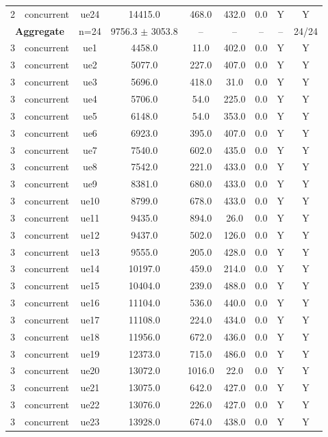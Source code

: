 \begin{table}[ht]
\begin{tabular}{|c|c|c|c|c|c|c|c|c|}
2 & concurrent & ue24 & 14415.0 & 468.0 & 432.0 & 0.0 & Y & Y \\
\multicolumn{2}{|c|}{\textbf{Aggregate}} & n=24 & 9756.3 $\pm$ 3053.8 & -- & -- & -- & -- & 24/24 \\
\hline
3 & concurrent & ue1 & 4458.0 & 11.0 & 402.0 & 0.0 & Y & Y \\
3 & concurrent & ue2 & 5077.0 & 227.0 & 407.0 & 0.0 & Y & Y \\
3 & concurrent & ue3 & 5696.0 & 418.0 & 31.0 & 0.0 & Y & Y \\
3 & concurrent & ue4 & 5706.0 & 54.0 & 225.0 & 0.0 & Y & Y \\
3 & concurrent & ue5 & 6148.0 & 54.0 & 353.0 & 0.0 & Y & Y \\
3 & concurrent & ue6 & 6923.0 & 395.0 & 407.0 & 0.0 & Y & Y \\
3 & concurrent & ue7 & 7540.0 & 602.0 & 435.0 & 0.0 & Y & Y \\
3 & concurrent & ue8 & 7542.0 & 221.0 & 433.0 & 0.0 & Y & Y \\
3 & concurrent & ue9 & 8381.0 & 680.0 & 433.0 & 0.0 & Y & Y \\
3 & concurrent & ue10 & 8799.0 & 678.0 & 433.0 & 0.0 & Y & Y \\
3 & concurrent & ue11 & 9435.0 & 894.0 & 26.0 & 0.0 & Y & Y \\
3 & concurrent & ue12 & 9437.0 & 502.0 & 126.0 & 0.0 & Y & Y \\
3 & concurrent & ue13 & 9555.0 & 205.0 & 428.0 & 0.0 & Y & Y \\
3 & concurrent & ue14 & 10197.0 & 459.0 & 214.0 & 0.0 & Y & Y \\
3 & concurrent & ue15 & 10404.0 & 239.0 & 488.0 & 0.0 & Y & Y \\
3 & concurrent & ue16 & 11104.0 & 536.0 & 440.0 & 0.0 & Y & Y \\
3 & concurrent & ue17 & 11108.0 & 224.0 & 434.0 & 0.0 & Y & Y \\
3 & concurrent & ue18 & 11956.0 & 672.0 & 436.0 & 0.0 & Y & Y \\
3 & concurrent & ue19 & 12373.0 & 715.0 & 486.0 & 0.0 & Y & Y \\
3 & concurrent & ue20 & 13072.0 & 1016.0 & 22.0 & 0.0 & Y & Y \\
3 & concurrent & ue21 & 13075.0 & 642.0 & 427.0 & 0.0 & Y & Y \\
3 & concurrent & ue22 & 13076.0 & 226.0 & 427.0 & 0.0 & Y & Y \\
3 & concurrent & ue23 & 13928.0 & 674.0 & 438.0 & 0.0 & Y & Y \\

\end{tabular}
\end{table}
